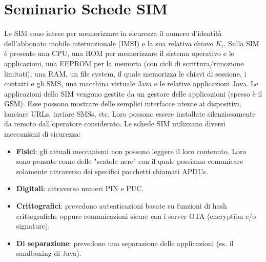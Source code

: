 \chapter{Seminario Schede SIM}
Le SIM sono intese per memorizzare in sicurezza il numero d'identità dell'abbonato mobile internazionale (IMSI) e la sua relativa chiave $K_i$. Sulla SIM è presente una CPU, una ROM per memorizzare il sistema operativo e le applicazioni, una EEPROM per la memoria (con cicli di scrittura/rimozione limitati), una RAM, un file system, il quale memorizza le chiavi di sessione, i contatti e gli SMS, una macchina virtuale Java e le relative applicazioni Java. Le applicazioni della SIM vengono gestite da un gestore delle applicazioni (spesso è il GSM). Esse possono mostrare delle semplici interfacce utente ai dispositivi, lanciare URLs, inviare SMSs, etc. Loro possono essere installate silenziosamente da remoto dall'operatore considerato. Le schede SIM utilizzano diversi meccanismi di sicurezza:
\begin{itemize}
    \item \textbf{Fisici}: gli attuali meccanismi non possono leggere il loro contenuto. Loro sono pensate come delle "scatole nere" con il quale possiamo comunicare solamente attraverso dei specifici pacchetti chiamati APDUs.
    \item \textbf{Digitali}: attraverso numeri PIN e PUC.
    \item \textbf{Crittografici}: prevedono autenticazioni basate su funzioni di hash crittografiche oppure comunicazioni sicure con i server OTA (encryption e/o signature).
    \item \textbf{Di separazione}: prevedono una separazione delle applicazioni (es. il sandboxing di Java).
\end{itemize}

